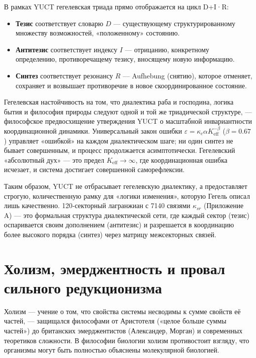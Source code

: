 \documentclass[12pt,a4paper]{article}
\begin{document}
	В рамках YUCT гегелевская триада прямо отображается на цикл D+I·R:
	\begin{itemize}
		\item \textbf{Тезис} соответствует словарю \(D\) — существующему структурированному множеству возможностей, «положенному» состоянию.
		\item \textbf{Антитезис} соответствует индексу \(I\) — отрицанию, конкретному определению, противоречащему тезису, вносящему новую информацию.
		\item \textbf{Синтез} соответствует резонансу \(R\) — Aufhebung (снятию), которое отменяет, сохраняет и возвышает противоречие в новое скоординированное состояние.
	\end{itemize}
	
	Гегелевская настойчивость на том, что диалектика раба и господина, логика бытия и философия природы следуют одной и той же триадической структуре, — философское предвосхищение утверждения YUCT о масштабной инвариантности координационной динамики. Универсальный закон ошибки \(\varepsilon = \kappa_c \alpha K_{\mathrm{eff}}^{-\beta}\) (\(\beta=0.67\)) управляет «ошибкой» на каждом диалектическом шаге; ни один синтез не бывает совершенным, и процесс продолжается асимптотически. Гегелевский «абсолютный дух» — это предел \(K_{\mathrm{eff}} \to \infty\), где координационная ошибка исчезает, и система достигает совершенной саморефлексии.
	
	Таким образом, YUCT не отбрасывает гегелевскую диалектику, а предоставляет строгую, количественную рамку для «логики изменения», которую Гегель описал лишь качественно. 120‑секторный лагранжиан с 7140 связями \(\kappa_{sr}\) (Приложение A) — это формальная структура диалектической сети, где каждый сектор (тезис) оспаривается своим дополнением (антитезис) и разрешается в координацию более высокого порядка (синтез) через матрицу межсекторных связей.
	
	\section{Холизм, эмерджентность и провал сильного редукционизма}
	
	Холизм — учение о том, что свойства системы несводимы к сумме свойств её частей, — защищался философами от Аристотеля («целое больше суммы частей») до британских эмерджентистов (Александер, Морган) и современных теоретиков сложности. В философии биологии холизм противостоит взгляду, что организмы могут быть полностью объяснены молекулярной биологией.
	
\end{document}

